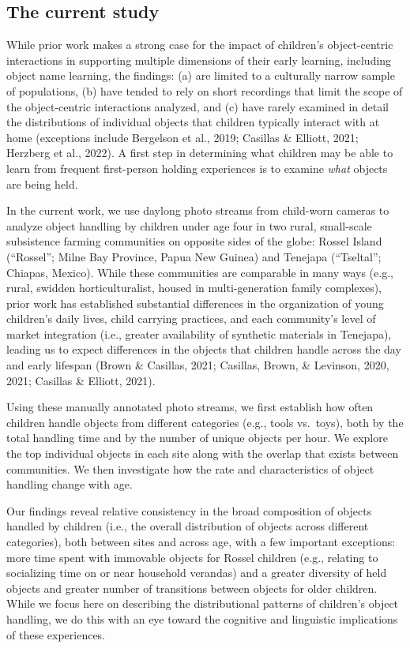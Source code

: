 \documentclass[10pt, letterpaper]{article}
\begin{document}
\hypertarget{the-current-study}{%
\subsection{The current study}\label{the-current-study}}

While prior work makes a strong case for the impact of children's
object-centric interactions in supporting multiple dimensions of their
early learning, including object name learning, the findings: (a) are
limited to a culturally narrow sample of populations, (b) have tended to
rely on short recordings that limit the scope of the object-centric
interactions analyzed, and (c) have rarely examined in detail the
distributions of individual objects that children typically interact
with at home (exceptions include Bergelson et al., 2019; Casillas \&
Elliott, 2021; Herzberg et al., 2022). A first step in determining what
children may be able to learn from frequent first-person holding
experiences is to examine \emph{what} objects are being held.

In the current work, we use daylong photo streams from child-worn
cameras to analyze object handling by children under age four in two
rural, small-scale subsistence farming communities on opposite sides of
the globe: Rossel Island (``Rossel''; Milne Bay Province, Papua New
Guinea) and Tenejapa (``Tseltal''; Chiapas, Mexico). While these
communities are comparable in many ways (e.g., rural, swidden
horticulturalist, housed in multi-generation family complexes), prior
work has established substantial differences in the organization of
young children's daily lives, child carrying practices, and each
community's level of market integration (i.e., greater availability of
synthetic materials in Tenejapa), leading us to expect differences in
the objects that children handle across the day and early lifespan
(Brown \& Casillas, 2021; Casillas, Brown, \& Levinson, 2020, 2021;
Casillas \& Elliott, 2021).

Using these manually annotated photo streams, we first establish how
often children handle objects from different categories (e.g., tools
vs.~toys), both by the total handling time and by the number of unique
objects per hour. We explore the top individual objects in each site
along with the overlap that exists between communities. We then
investigate how the rate and characteristics of object handling change
with age.

Our findings reveal relative consistency in the broad composition of
objects handled by children (i.e., the overall distribution of objects
across different categories), both between sites and across age, with a
few important exceptions: more time spent with immovable objects for
Rossel children (e.g., relating to socializing time on or near household
verandas) and a greater diversity of held objects and greater number of
transitions between objects for older children. While we focus here on
describing the distributional patterns of children's object handling, we
do this with an eye toward the cognitive and linguistic implications of
these experiences.
\end{document}
